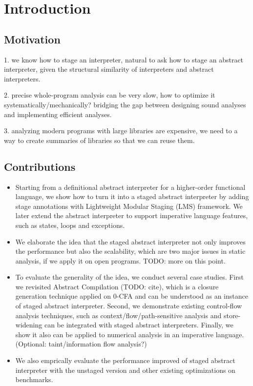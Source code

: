 \section{Introduction}

\subsection{Motivation}

1. we know how to stage an interpreter, natural to ask how to stage an abstract interpreter, given 
the structural similarity of interpreters and abstract interpreters.

2. precise whole-program analysis can be very slow, how to optimize it systematically/mechanically?
bridging the gap between designing sound analyses and implementing efficient analyses.

3. analyzing modern programs with large libraries are expensive, we need to a way to create
summaries of libraries so that we can reuse them.

\subsection{Contributions}

\begin{itemize}
\item Starting from a definitional abstract interpreter for a higher-order functional language,
  we show how to turn it into a staged abstract interpreter by adding stage annotations with 
  Lightweight Modular Staging (LMS) framework. We later extend the abstract interpreter to support
  imperative language features, such as states, loops and exceptions.
\item We elaborate the idea that the staged abstract interpreter not only improves the performance 
  but also the scalability, which are two major issues in static analysis, if we apply it on open
  programs. TODO: more on this point.
\item To evaluate the generality of the idea, we conduct several case studies. 
  First we revisited Abstract Compilation (TODO: cite), which is a closure generation technique applied 
  on 0-CFA and can be understood as an instance of staged abstract interpreter. 
  Second, we demonstrate existing control-flow analysis techniques, such as context/flow/path-sensitive 
  analysis and store-widening can be integrated with staged abstract interpreters.
  Finally, we show it also can be applied to numerical analysis in an imperative language.
  (Optional: taint/information flow analysis?)
\item We also emprically evaluate the performance improved of staged abstract interpreter with the 
  unstaged version and other existing optimizations on benchmarks.
\end{itemize}
